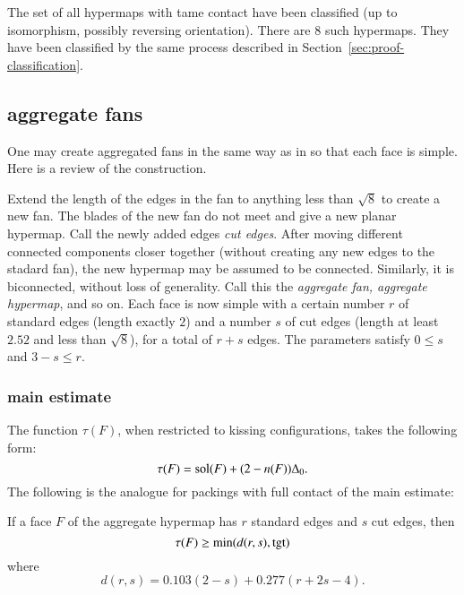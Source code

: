 The set of all hypermaps with tame contact have been classified (up to isomorphism, possibly reversing orientation).  There are $8$ such hypermaps.  They have been classified by the same process described in Section~\ref{sec:proof-classification}.


\subsection{aggregate fans}

One may create aggregated fans in the same way as in \cite{Hales:2006:DCG} so that each face is simple.  Here is a review of the construction.

Extend the length of the edges in the fan to anything less than  $\sqrt8$ to create a new fan.  The blades of the new fan do not meet and give a new planar hypermap.  Call the newly added edges {\it cut edges}.  After moving different connected components closer together (without creating any new edges to the stadard fan),  the new hypermap may be assumed to be connected.  Similarly, it is biconnected, without loss of generality.  Call this the {\it aggregate fan, aggregate hypermap}, and so on.   Each face is now simple with a certain number $r$ of standard edges (length exactly $2$) and a number $s$ of cut edges (length at least $2.52$ and less than $\sqrt8$), for a total of $r+s$ edges.  
The parameters satisfy $0\le s$ and $3-s \le r$.


\subsubsection{main estimate}

The function $\tau(F)$, when restricted to kissing configurations, takes the following form:
$$
\tau(F) = \operatorname{sol}(F) + (2-n(F)) \Delta_0.
$$
The following is the analogue for packings with full contact of the main estimate:

\begin{theorem}\label{lemma:main-estimate-12}  If a face $F$ of the aggregate hypermap has $r$ standard edges and $s$ cut edges, then 
$$\tau(F) \ge \min(d(r,s),{\operatorname{tgt}})$$
where 
$$
d(r,s) = 0.103 (2-s) + 0.277 (r+2s-4).
$$
\end{theorem}

